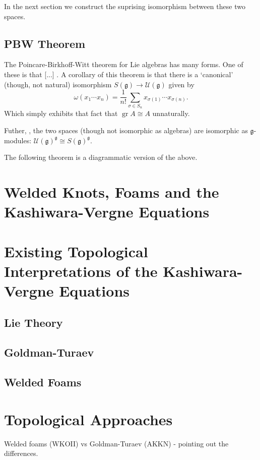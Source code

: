 \documentclass[12pt]{report}
\theoremstyle{regular}
\numberwithin{clause}{chapter}
\newcommand{\scaffold}[1]{
\begin{mdframed}[style=scaffold]
        {\color{teal}#1}
\end{mdframed}
}
\begin{document}
        \scaffold{In the next section we construct the suprising isomorphism between these two spaces.}

        \section{PBW Theorem}

        \scaffold{The Poincare-Birkhoff-Witt theorem for Lie algebras has many forms. One of these is that [...] . A corollary of this theorem \cite{enveloping-algebras} is that there is a `canonical' (though, not natural) isomorphism \(S(\mathfrak{g}) \to \mathcal{U}(\mathfrak{g})\) given by \[\omega(x_{1} \cdots x_{n}) = \frac{1}{n!} \sum_{\sigma \in S_{n}} x_{\sigma(1)} \cdots x_{\sigma(n)}.\] Which simply exhibits that fact that \(\operatorname{gr} A \cong A\) unnaturally.}

        \scaffold{Futher, \cite{enveloping-algebras}, the two spaces (though not isomorphic as algebras) are isomorphic as \(\mathfrak{g}\)-modules: \(\mathcal{U}(\mathfrak{g})^{\mathfrak{g}} \cong S(\mathfrak{g})^{\mathfrak{g}}\).}

        \scaffold{The following theorem is a diagrammatic version of the above.}

        \chapter{Welded Knots, Foams and the Kashiwara-Vergne Equations}

        \chapter{Existing Topological Interpretations of the Kashiwara-Vergne Equations}

        \section{Lie Theory}

        \section{Goldman-Turaev}

        \section{Welded Foams}

        \chapter{Topological Approaches}
        \scaffold{Welded foams (WKOII) vs Goldman-Turaev (AKKN) - pointing out the differences.}
\end{document}
